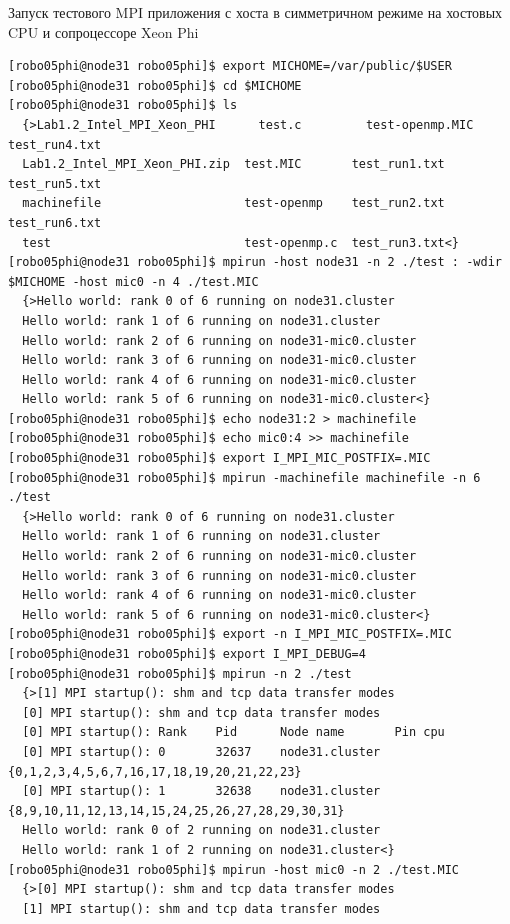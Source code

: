 \documentclass[pscyr,10pt]{hedlab}
\begin{document}
  \begin{center}
    Запуск тестового MPI приложения с хоста в симметричном режиме на хостовых
      CPU и сопроцессоре Xeon Phi
  \end{center}

\begin{lstlisting}
[robo05phi@node31 robo05phi]$ export MICHOME=/var/public/$USER
[robo05phi@node31 robo05phi]$ cd $MICHOME
[robo05phi@node31 robo05phi]$ ls
  {>Lab1.2_Intel_MPI_Xeon_PHI      test.c         test-openmp.MIC  test_run4.txt
  Lab1.2_Intel_MPI_Xeon_PHI.zip  test.MIC       test_run1.txt    test_run5.txt
  machinefile                    test-openmp    test_run2.txt    test_run6.txt
  test                           test-openmp.c  test_run3.txt<}
[robo05phi@node31 robo05phi]$ mpirun -host node31 -n 2 ./test : -wdir $MICHOME -host mic0 -n 4 ./test.MIC
  {>Hello world: rank 0 of 6 running on node31.cluster
  Hello world: rank 1 of 6 running on node31.cluster
  Hello world: rank 2 of 6 running on node31-mic0.cluster
  Hello world: rank 3 of 6 running on node31-mic0.cluster
  Hello world: rank 4 of 6 running on node31-mic0.cluster
  Hello world: rank 5 of 6 running on node31-mic0.cluster<}
[robo05phi@node31 robo05phi]$ echo node31:2 > machinefile
[robo05phi@node31 robo05phi]$ echo mic0:4 >> machinefile
[robo05phi@node31 robo05phi]$ export I_MPI_MIC_POSTFIX=.MIC
[robo05phi@node31 robo05phi]$ mpirun -machinefile machinefile -n 6 ./test
  {>Hello world: rank 0 of 6 running on node31.cluster
  Hello world: rank 1 of 6 running on node31.cluster
  Hello world: rank 2 of 6 running on node31-mic0.cluster
  Hello world: rank 3 of 6 running on node31-mic0.cluster
  Hello world: rank 4 of 6 running on node31-mic0.cluster
  Hello world: rank 5 of 6 running on node31-mic0.cluster<}
[robo05phi@node31 robo05phi]$ export -n I_MPI_MIC_POSTFIX=.MIC
[robo05phi@node31 robo05phi]$ export I_MPI_DEBUG=4
[robo05phi@node31 robo05phi]$ mpirun -n 2 ./test
  {>[1] MPI startup(): shm and tcp data transfer modes
  [0] MPI startup(): shm and tcp data transfer modes
  [0] MPI startup(): Rank    Pid      Node name       Pin cpu
  [0] MPI startup(): 0       32637    node31.cluster  {0,1,2,3,4,5,6,7,16,17,18,19,20,21,22,23}
  [0] MPI startup(): 1       32638    node31.cluster  {8,9,10,11,12,13,14,15,24,25,26,27,28,29,30,31}
  Hello world: rank 0 of 2 running on node31.cluster
  Hello world: rank 1 of 2 running on node31.cluster<}
[robo05phi@node31 robo05phi]$ mpirun -host mic0 -n 2 ./test.MIC
  {>[0] MPI startup(): shm and tcp data transfer modes
  [1] MPI startup(): shm and tcp data transfer modes

\end{lstlisting}
\end{document}
